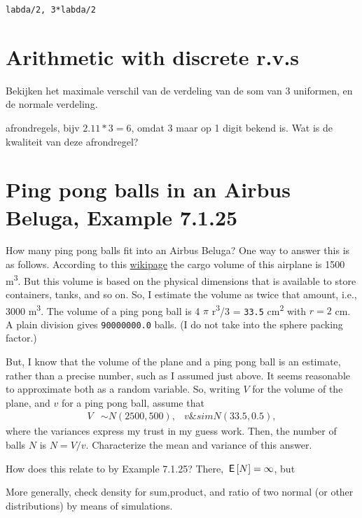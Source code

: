 \documentclass[a4paper]{article}
\begin{document}
\begin{verbatim}
labda/2, 3*labda/2
\end{verbatim}


\section{Arithmetic with discrete r.v.s}
\label{sec:orgb53976d}


Bekijken het maximale verschil van de verdeling van de som van 3 uniformen, en de normale verdeling. 

afrondregels, bijv \(2.11*3= 6\), omdat \(3\) maar op 1 digit bekend is. Wat is de kwaliteit van deze afrondregel?

\section{Ping pong balls in an Airbus Beluga, Example 7.1.25}
\label{sec:org08202e8}

How many ping pong balls fit into an Airbus Beluga? One way to answer this is as follows. According to this \href{https://en.wikipedia.org/wiki/Airbus\_Beluga}{wikipage} the cargo volume of this airplane is 1500 m\textsuperscript{3}. But this volume is based on the physical dimensions that is available to store containers, tanks, and so on. So, I estimate the volume as twice that amount, i.e., 3000 m\textsuperscript{3}. The volume of a ping pong ball is 4  \(\pi\) r\textsuperscript{3}/3 = \texttt{33.5} cm\textsuperscript{2} with \(r=2\) cm.  A plain division gives
\texttt{90000000.0}  balls. (I do not take into the sphere packing factor.)

But, I know that the volume of the plane and a ping pong ball is an estimate, rather than a precise number, such as I assumed just above. It seems reasonable to approximate both as a random variable. So, writing \(V\) for the volume of the plane, and \(v\) for a ping pong ball, assume that
   \begin{align*}
V &\sim N(2500, 500), & v\&sim N(33.5, 0.5),
\end{align*}
where the variances express my trust in my guess work. Then, the number of balls \(N\) is \(N = V/v\). 
Characterize the mean and variance of this answer.

How does this relate to by Example 7.1.25? There, \(\,\mathsf{E}\left[N\right] = \infty\), but 

More generally,  check density for sum,product, and ratio of two normal (or other distributions)  by means of simulations.
\end{document}

